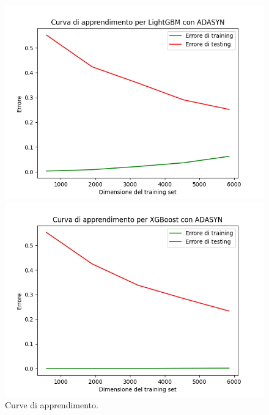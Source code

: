 \begin{figure}[H]
    \begin{minipage}[b]{0.45\linewidth}
      \centering
      \includegraphics[scale=0.5]{img/learning_curve_LightGBM_ADASYN.png}
      
    \end{minipage}
    \hfill
    \begin{minipage}[b]{0.45\linewidth}
      \centering
      \includegraphics[scale=0.5]{img/learning_curve_XGBoost_ADASYN.png}
      
    \end{minipage}
    \caption{Curve di apprendimento.}
    
    \end{figure}

